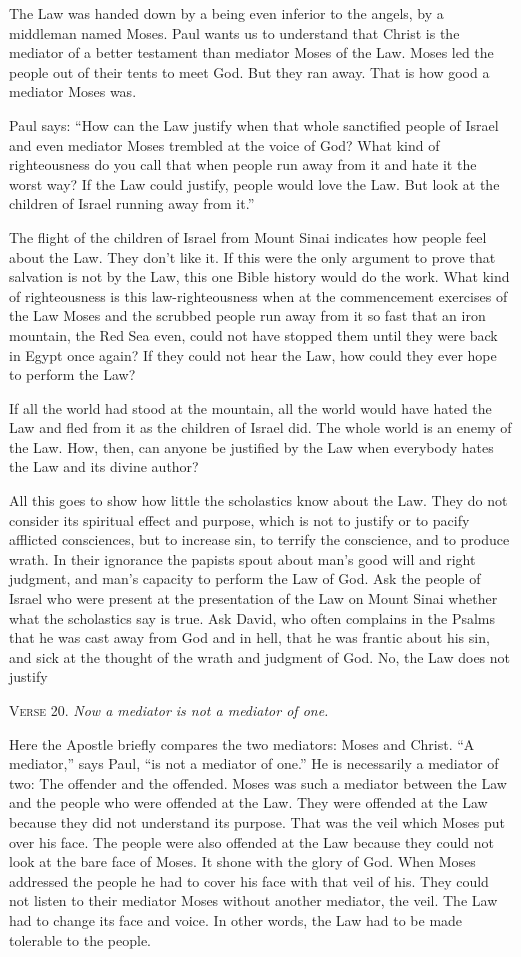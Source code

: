 The Law was handed down by a being even inferior to the angels, by a middleman named Moses. Paul wants us to understand that Christ is the mediator of a better testament than mediator Moses of the Law. Moses led the people out of their tents to meet God. But they ran away. That is how good a mediator Moses was.

Paul says: “How can the Law justify when that whole sanctified people of Israel and even mediator Moses trembled at the voice of God? What kind of righteousness do you call that when people run away from it and hate it the worst way? If the Law could justify, people would love the Law. But look at the children of Israel running away from it.”

The flight of the children of Israel from Mount Sinai indicates how people feel about the Law. They don’t like it. If this were the only argument to prove that salvation is not by the Law, this one Bible history would do the work. What kind of righteousness is this law-righteousness when at the commencement exercises of the Law Moses and the scrubbed people run away from it so fast that an iron mountain, the Red Sea even, could not have stopped them until they were back in Egypt once again? If they could not hear the Law, how could they ever hope to perform the Law?

If all the world had stood at the mountain, all the world would have hated the Law and fled from it as the children of Israel did. The whole world is an enemy of the Law. How, then, can anyone be justified by the Law when everybody hates the Law and its divine author?

All this goes to show how little the scholastics know about the Law. They do not consider its spiritual effect and purpose, which is not to justify or to pacify afflicted consciences, but to increase sin, to terrify the conscience, and to produce wrath. In their ignorance the papists spout about man’s good will and right judgment, and man’s capacity to perform the Law of God. Ask the people of Israel who were present at the presentation of the Law on Mount Sinai whether what the scholastics say is true. Ask David, who often complains in the Psalms that he was cast away from God and in hell, that he was frantic about his sin, and sick at the thought of the wrath and judgment of God. No, the Law does not justify

\textsc{Verse} 20. \emph{Now a mediator is not a mediator of one.}

Here the Apostle briefly compares the two mediators: Moses and Christ. “A mediator,” says Paul, “is not a mediator of one.” He is necessarily a mediator of two: The offender and the offended. Moses was such a mediator between the Law and the people who were offended at the Law. They were offended at the Law because they did not understand its purpose. That was the veil which Moses put over his face. The people were also offended at the Law because they could not look at the bare face of Moses. It shone with the glory of God. When Moses addressed the people he had to cover his face with that veil of his. They could not listen to their mediator Moses without another mediator, the veil. The Law had to change its face and voice. In other words, the Law had to be made tolerable to the people.


